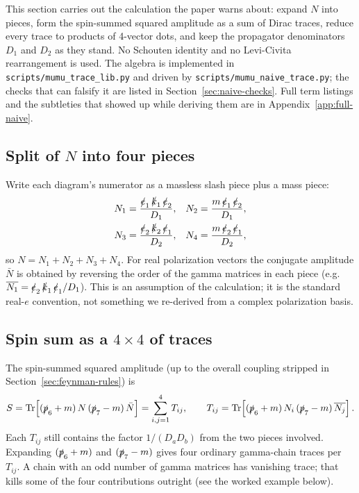 \documentclass[11pt]{article}
\begin{document}
This section carries out the calculation the paper warns about: expand
$N$ into pieces, form the spin-summed squared amplitude as a sum of Dirac
traces, reduce every trace to products of 4-vector dots, and keep the
propagator denominators $D_1$ and $D_2$ as they stand. No Schouten
identity and no Levi-Civita rearrangement is used. The algebra is
implemented in \texttt{scripts/mumu\_trace\_lib.py} and driven by
\texttt{scripts/mumu\_naive\_trace.py}; the checks that can falsify it are
listed in Section~\ref{sec:naive-checks}. Full term listings and the
subtleties that showed up while deriving them are in
Appendix~\ref{app:full-naive}.

\subsection{Split of $N$ into four pieces}
\label{sec:N-split}

Write each diagram's numerator as a massless slash piece plus a mass
piece:
\begin{align}
  N_1 &= \frac{\slashed e_1\,\slashed k_1\,\slashed e_2}{D_1}, &
  N_2 &= \frac{m\,\slashed e_1\,\slashed e_2}{D_1}, \nonumber\\
  N_3 &= \frac{\slashed e_2\,\slashed k_2\,\slashed e_1}{D_2}, &
  N_4 &= \frac{m\,\slashed e_2\,\slashed e_1}{D_2},
  \label{eq:N-pieces}
\end{align}
so $N=N_1+N_2+N_3+N_4$. For real polarization vectors the conjugate
amplitude $\bar N$ is obtained by reversing the order of the gamma
matrices in each piece (e.g.\ $\overline{N_1}=\slashed e_2\,\slashed k_1\,
\slashed e_1/D_1$). This is an assumption of the calculation; it is the
standard real-$e$ convention, not something we re-derived from a complex
polarization basis.

\subsection{Spin sum as a $4\times 4$ of traces}
\label{sec:16-terms}

The spin-summed squared amplitude (up to the overall coupling stripped in
Section~\ref{sec:feynman-rules}) is
\begin{equation}
  S = \mathrm{Tr}\!\left[(\slashed p_6+m)\,N\,(\slashed p_7-m)\,\bar N\right]
    = \sum_{i,j=1}^{4} T_{ij},
  \qquad
  T_{ij} =
  \mathrm{Tr}\!\left[(\slashed p_6+m)\,N_i\,(\slashed p_7-m)\,\overline{N_j}\right].
  \label{eq:S-def}
\end{equation}
Each $T_{ij}$ still contains the factor $1/(D_a D_b)$ from the two pieces
involved. Expanding $(\slashed p_6+m)$ and $(\slashed p_7-m)$ gives four
ordinary gamma-chain traces per $T_{ij}$. A chain with an odd number of
gamma matrices has vanishing trace; that kills some of the four
contributions outright (see the worked example below).
\end{document}

